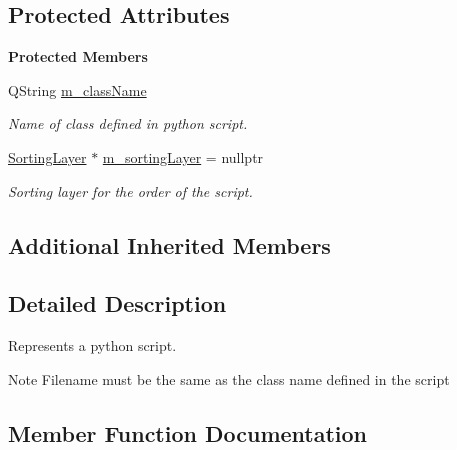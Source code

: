\subsection*{Protected Attributes}
\begin{Indent}\textbf{ Protected Members}\par
\begin{DoxyCompactItemize}
\item 
\mbox{\label{classrev_1_1_python_class_script_a1733567f6b9e4ad15adaf6db50f881b0}} 
Q\+String \mbox{\hyperlink{classrev_1_1_python_class_script_a1733567f6b9e4ad15adaf6db50f881b0}{m\+\_\+class\+Name}}
\begin{DoxyCompactList}\small\item\em Name of class defined in python script. \end{DoxyCompactList}\item 
\mbox{\label{classrev_1_1_python_class_script_a479af632e7fb409fc8c5b47a1fbfa033}} 
\mbox{\hyperlink{structrev_1_1_sorting_layer}{Sorting\+Layer}} $\ast$ \mbox{\hyperlink{classrev_1_1_python_class_script_a479af632e7fb409fc8c5b47a1fbfa033}{m\+\_\+sorting\+Layer}} = nullptr
\begin{DoxyCompactList}\small\item\em Sorting layer for the order of the script. \end{DoxyCompactList}\end{DoxyCompactItemize}
\end{Indent}
\subsection*{Additional Inherited Members}


\subsection{Detailed Description}
Represents a python script. 

\begin{DoxyNote}{Note}
Filename must be the same as the class name defined in the script 
\end{DoxyNote}


\subsection{Member Function Documentation}
\mbox{\label{classrev_1_1_python_class_script_adbdcf0106db89f58196a253e5d3b6831}} 
